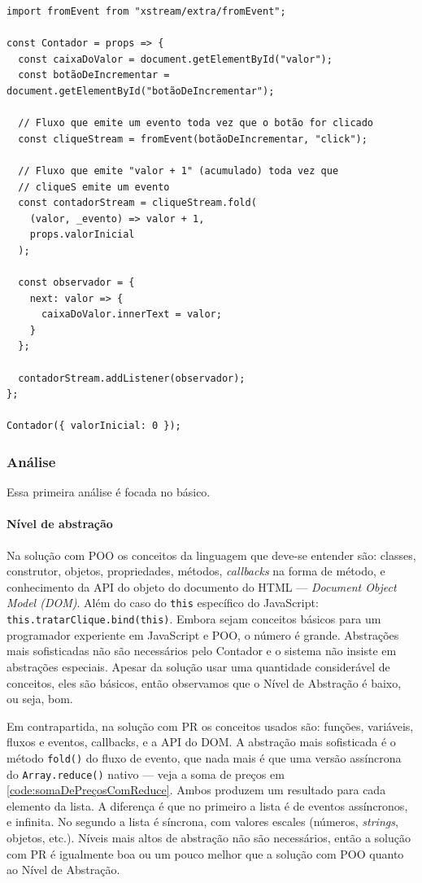 \begin{listing}[htbp]
\caption{\label{code:contadorComPR}Contador com PR.}
\begin{verbatim}
import fromEvent from "xstream/extra/fromEvent";

const Contador = props => {
  const caixaDoValor = document.getElementById("valor");
  const botãoDeIncrementar = document.getElementById("botãoDeIncrementar");

  // Fluxo que emite um evento toda vez que o botão for clicado
  const cliqueStream = fromEvent(botãoDeIncrementar, "click");

  // Fluxo que emite "valor + 1" (acumulado) toda vez que
  // cliqueS emite um evento
  const contadorStream = cliqueStream.fold(
    (valor, _evento) => valor + 1,
    props.valorInicial
  );

  const observador = {
    next: valor => {
      caixaDoValor.innerText = valor;
    }
  };

  contadorStream.addListener(observador);
};

Contador({ valorInicial: 0 });
\end{verbatim}
\end{listing}
\subsubsection{Análise}
\label{sec:org5e27f42}

Essa primeira análise é focada no básico.
\paragraph{Nível de abstração}
\label{sec:orgf164747}
Na solução com POO os conceitos da linguagem que deve-se entender são:
classes, construtor, objetos, propriedades, métodos, \emph{callbacks} na forma
de método, e conhecimento da API do objeto do documento do HTML ---
\emph{Document Object Model (DOM)}.
Além do caso do \texttt{this} específico do JavaScript:
\texttt{this.tratarClique.bind(this)}.
Embora sejam conceitos básicos para um programador experiente em JavaScript
e POO, o número é grande.
Abstrações mais sofisticadas não são necessários pelo Contador e o sistema
não insiste em abstrações especiais.
Apesar da solução usar uma quantidade considerável de conceitos, eles são
básicos, então observamos que o Nível de Abstração é baixo, ou seja, bom.

Em contrapartida, na solução com PR os conceitos usados são: funções,
variáveis, fluxos e eventos, callbacks, e a API do DOM.
A abstração mais sofisticada é o método \texttt{fold()} do fluxo de evento,
que nada mais é que uma versão assíncrona do \texttt{Array.reduce()}
nativo --- veja a soma de preços em \ref{code:somaDePreçosComReduce}.
Ambos produzem um resultado para cada elemento da lista.
A diferença é que no primeiro a lista é de eventos assíncronos, e infinita.
No segundo a lista é síncrona, com valores escales (números, \emph{strings},
objetos, etc.).
Níveis mais altos de abstração não são necessários, então a solução com PR
é igualmente boa ou um pouco melhor que a solução com POO quanto ao Nível
de Abstração.
